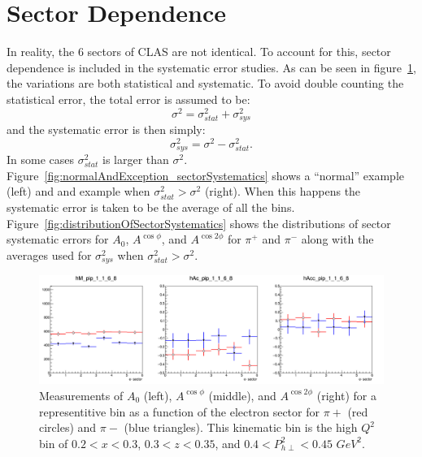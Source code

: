\section{Sector Dependence}
\label{sec:SectorDependence}
In reality, the 6 sectors of CLAS are not identical.
To account for this, sector dependence is included in the systematic error studies.
As can be seen in figure~\ref{fig:sectorDep_0_1_4_3}, the variations are both statistical and systematic.
To avoid double counting the statistical error, the total error is assumed to be:
%
\begin{equation}
\label{eq:totalError_stat_sys}
\sigma^2 = \sigma^2_{stat} + \sigma^2_{sys}
\end{equation}
%
and the systematic error is then simply:
%
\begin{equation}
\label{eq:sysError_sectorDep}
\sigma^2_{sys} = \sigma^2 - \sigma^2_{stat}.
\end{equation}
%
In some cases $\sigma^2_{stat}$ is larger than $\sigma^2$.
Figure~\ref{fig:normalAndException_sectorSystematics} shows a ``normal'' example (left) and and example when $\sigma^2_{stat} > \sigma^2$ (right).
When this happens the systematic error is taken to be the average of all the bins.
Figure~\ref{fig:distributionOfSectorSystematics} shows the distributions of sector systematic errors for $A_0$, $A^{\cos\phi}$, and $A^{\cos 2\phi}$ for $\pi^+$ and $\pi^-$ along with the averages used for $\sigma^2_{sys}$ when $\sigma^2_{stat} > \sigma^2$.
%
\begin{figure}[htp]
\centering
\includegraphics[width=6in]{figures/sectorDep_1_1_6_8.png}
\caption{Measurements of $A_0$ (left), $A^{\cos\phi}$ (middle), and $A^{\cos2\phi}$ (right) for a representitive bin as a function of the electron sector for $\pi+$ (red circles) and $\pi-$ (blue triangles). This kinematic bin is the high $Q^2$ bin of $0.2 < x < 0.3$, $0.3 < z < 0.35$, and $0.4 < P_{h\perp}^2 < 0.45$ $GeV^2$.}
\label{fig:sectorDep_0_1_4_3}
\end{figure}
%
